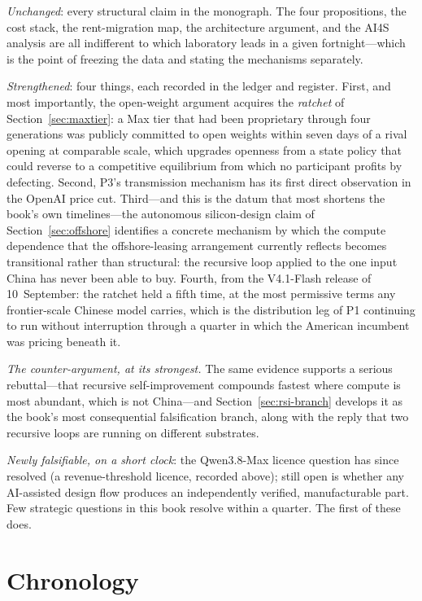 \emph{Unchanged}: every structural claim in the monograph. The four propositions, the cost stack, the rent-migration map, the architecture argument, and the AI4S analysis are all indifferent to which laboratory leads in a given fortnight---which is the point of freezing the data and stating the mechanisms separately.

\emph{Strengthened}: four things, each recorded in the ledger and register. First, and most importantly, the open-weight argument acquires the \emph{ratchet} of Section~\ref{sec:maxtier}: a Max tier that had been proprietary through four generations was publicly committed to open weights within seven days of a rival opening at comparable scale, which upgrades openness from a state policy that could reverse to a competitive equilibrium from which no participant profits by defecting. Second, P3's transmission mechanism has its first direct observation in the OpenAI price cut. Third---and this is the datum that most shortens the book's own timelines---the autonomous silicon-design claim of Section~\ref{sec:offshore} identifies a concrete mechanism by which the compute dependence that the offshore-leasing arrangement currently reflects becomes transitional rather than structural: the recursive loop applied to the one input China has never been able to buy. Fourth, from the V4.1-Flash release of 10~September: the ratchet held a fifth time, at the most permissive terms any frontier-scale Chinese model carries, which is the distribution leg of P1 continuing to run without interruption through a quarter in which the American incumbent was pricing beneath it.

\emph{The counter-argument, at its strongest.} The same evidence supports a serious rebuttal---that recursive self-improvement compounds fastest where compute is most abundant, which is not China---and Section~\ref{sec:rsi-branch} develops it as the book's most consequential falsification branch, along with the reply that two recursive loops are running on different substrates.

\emph{Newly falsifiable, on a short clock}: the Qwen3.8-Max licence question has since resolved (a revenue-threshold licence, recorded above); still open is whether any AI-assisted design flow produces an independently verified, manufacturable part. Few strategic questions in this book resolve within a quarter. The first of these does.

\chapter{Chronology}
\label{app:chronology}

